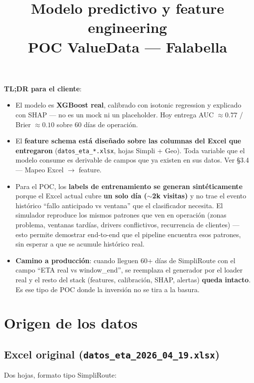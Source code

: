 \documentclass[11pt,a4paper]{article}
\title{\textbf{Modelo predictivo y feature engineering}\\[0.3em]
       \large POC ValueData --- Falabella}
\author{}
\date{}
\newenvironment{quoteblock}{%
  \begin{shaded}\noindent\ignorespaces}{%
  \end{shaded}}
\begin{document}
\maketitle
\thispagestyle{empty}
\vspace{-2em}

\begin{quoteblock}
\textbf{TL;DR para el cliente}:
\begin{itemize}
  \item El modelo es \textbf{XGBoost real}, calibrado con isotonic regression y explicado con SHAP --- no es un mock ni un placeholder. Hoy entrega AUC $\approx 0.77$ / Brier $\approx 0.10$ sobre 60 días de operación.
  \item El \textbf{feature schema está diseñado sobre las columnas del Excel que entregaron} (\texttt{datos\_eta\_*.xlsx}, hojas Simpli + Geo). Toda variable que el modelo consume es derivable de campos que ya existen en sus datos. Ver §3.4 --- Mapeo Excel $\rightarrow$ feature.
  \item Para el POC, los \textbf{labels de entrenamiento se generan sintéticamente} porque el Excel actual cubre \textbf{un solo día ($\sim$2k visitas)} y no trae el evento histórico ``fallo anticipado vs ventana'' que el clasificador necesita. El simulador reproduce los mismos patrones que ven en operación (zonas problema, ventanas tardías, drivers conflictivos, recurrencia de clientes) --- esto permite demostrar end-to-end que el pipeline encuentra esos patrones, sin esperar a que se acumule histórico real.
  \item \textbf{Camino a producción}: cuando lleguen 60+ días de SimpliRoute con el campo ``ETA real vs window\_end'', se reemplaza el generador por el loader real y el resto del stack (features, calibración, SHAP, alertas) \textbf{queda intacto}. Es ese tipo de POC donde la inversión no se tira a la basura.
\end{itemize}
\end{quoteblock}

\section{Origen de los datos}

\subsection{Excel original (\texttt{datos\_eta\_2026\_04\_19.xlsx})}

Dos hojas, formato tipo SimpliRoute:
\end{document}

